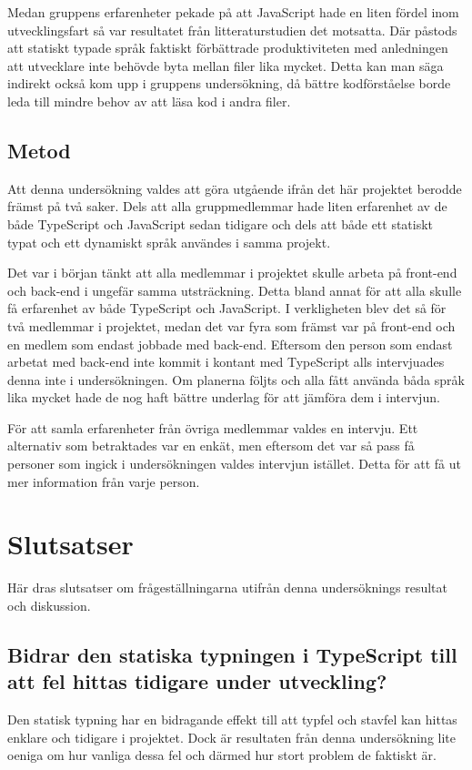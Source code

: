 Medan gruppens erfarenheter pekade på att JavaScript hade en liten fördel inom utvecklingsfart så var resultatet från litteraturstudien det motsatta. Där påstods att statiskt typade språk faktiskt förbättrade produktiviteten med anledningen att utvecklare inte behövde byta mellan filer lika mycket. \cite{henrik_maintainability} Detta kan man säga indirekt också kom upp i gruppens undersökning, då bättre kodförståelse borde leda till mindre behov av att läsa kod i andra filer.
\subsection{Metod}
Att denna undersökning valdes att göra utgående ifrån det här projektet berodde främst på två saker. Dels att alla gruppmedlemmar hade liten erfarenhet av de både TypeScript och JavaScript sedan tidigare och dels att både ett statiskt typat och ett dynamiskt språk användes i samma projekt.

Det var i början tänkt att alla medlemmar i projektet skulle arbeta på front-end och back-end i ungefär samma utsträckning. Detta bland annat för att alla skulle få erfarenhet av både TypeScript och JavaScript. I verkligheten blev det så för två medlemmar i projektet, medan det var fyra som främst var på front-end och en medlem som endast jobbade med back-end. Eftersom den person som endast arbetat med back-end inte kommit i kontant med TypeScript alls intervjuades denna inte i undersökningen. Om planerna följts och alla fått använda båda språk lika mycket hade de nog haft bättre underlag för att jämföra dem i intervjun.

För att samla erfarenheter från övriga medlemmar valdes en intervju. Ett alternativ som betraktades var en enkät, men eftersom det var så pass få personer som ingick i undersökningen valdes intervjun istället. Detta för att få ut mer information från varje person.

\section{Slutsatser}
Här dras slutsatser om frågeställningarna utifrån denna undersöknings resultat och diskussion.
\subsection{Bidrar den statiska typningen i TypeScript till att fel hittas tidigare under utveckling?}
Den statisk typning har en bidragande effekt till att typfel och stavfel kan hittas enklare och tidigare i projektet. Dock är resultaten från denna undersökning lite oeniga om hur vanliga dessa fel och därmed hur stort problem de faktiskt är.

